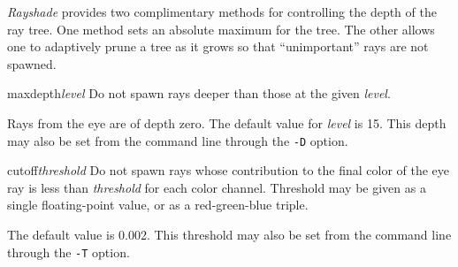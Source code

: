 {\em Rayshade} provides two complimentary methods for controlling the depth
of the ray tree.  One method sets an absolute maximum for the tree.  The
other allows one to adaptively prune a tree as it grows so that ``unimportant''
rays are not spawned.

\begin{defkey}{maxdepth}{{\em level}}
	Do not spawn rays deeper than those at the given {\em level}.
\end{defkey}
Rays from the eye are of depth zero.  The default value for
{\em level} is 15.
This depth may also be set from the command line through the {\tt -D} option.

\begin{defkey}{cutoff}{{\em threshold}}
	Do not spawn rays whose contribution to the final color of
	the eye ray is less than {\em threshold} for each color channel.
	Threshold may be given as a single floating-point value,
	or as a red-green-blue triple.
\end{defkey}
The default value is 0.002.  This threshold may also be set from
the command line through the {\tt -T} option.
